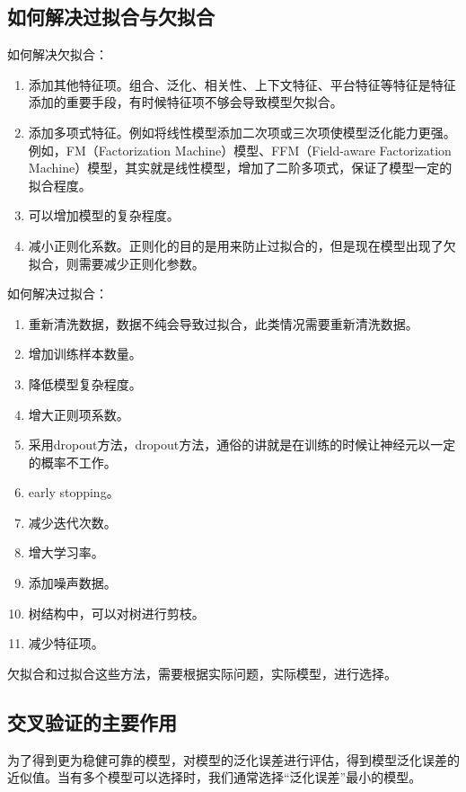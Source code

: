 \subsection{如何解决过拟合与欠拟合}

如何解决欠拟合：

\begin{enumerate}
	\itemsep0em
	\item 添加其他特征项。组合、泛化、相关性、上下文特征、平台特征等特征是特征添加的重要手段，有时候特征项不够会导致模型欠拟合。
	\item 添加多项式特征。例如将线性模型添加二次项或三次项使模型泛化能力更强。例如，FM（Factorization Machine）模型、FFM（Field-aware Factorization Machine）模型，其实就是线性模型，增加了二阶多项式，保证了模型一定的拟合程度。
	\item 可以增加模型的复杂程度。
	\item 减小正则化系数。正则化的目的是用来防止过拟合的，但是现在模型出现了欠拟合，则需要减少正则化参数。
\end{enumerate}

如何解决过拟合：

\begin{enumerate}
	\itemsep0em
	\item 重新清洗数据，数据不纯会导致过拟合，此类情况需要重新清洗数据。
	\item 增加训练样本数量。
	\item 降低模型复杂程度。
	\item 增大正则项系数。
	\item 采用dropout方法，dropout方法，通俗的讲就是在训练的时候让神经元以一定的概率不工作。
	\item early stopping。
	\item 减少迭代次数。
	\item 增大学习率。
	\item 添加噪声数据。
	\item 树结构中，可以对树进行剪枝。
	\item 减少特征项。
\end{enumerate}

欠拟合和过拟合这些方法，需要根据实际问题，实际模型，进行选择。

\subsection{交叉验证的主要作用}

为了得到更为稳健可靠的模型，对模型的泛化误差进行评估，得到模型泛化误差的近似值。当有多个模型可以选择时，我们通常选择``泛化误差''最小的模型。

